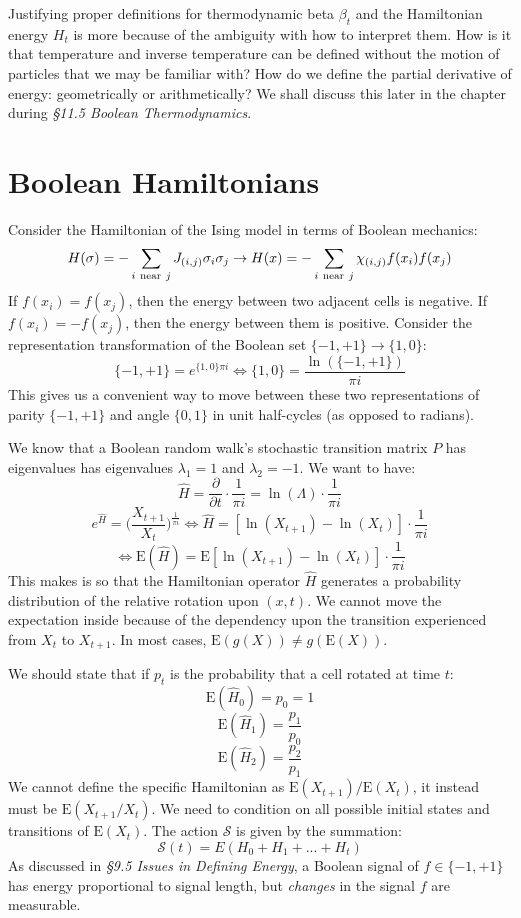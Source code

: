 \documentclass[10pt, a5paper, twoside, openright]{memoir}
\begin{document}
Justifying proper definitions for thermodynamic beta $\beta_t$ and the Hamiltonian energy $H_t$ is more because of the ambiguity with how to interpret them. How is it that temperature and inverse temperature can be defined without the motion of particles that we may be familiar with? How do we define the partial derivative of energy: geometrically or arithmetically? We shall discuss this later in the chapter during \textit{\S 11.5 Boolean Thermodynamics}.

\section{Boolean Hamiltonians}
Consider the Hamiltonian of the Ising model in terms of Boolean mechanics:
$$H(\sigma) = - \sum\limits_{i \ \textnormal{near} \ j} J_{(i, j)} \sigma_i \sigma_j \rightarrow H(x) = - \sum\limits_{i \ \textnormal{near} \ j} \chi_{(i, j)} f(x_i) f(x_j)$$
If $f(x_i) = f(x_j)$, then the energy between two adjacent cells is negative. If $f(x_i) = -f(x_j)$, then the energy between them is positive. Consider the representation transformation of the Boolean set $\{-1, +1\} \rightarrow \{1, 0\}$:
$$\{-1, +1\} = e^{\{1, 0\} \pi i} \iff \{1, 0\} = \frac{\ln(\{-1, +1\})}{\pi i}$$
This gives us a convenient way to move between these two representations of parity $\{-1, +1\}$ and angle $\{0, 1\}$ in unit half-cycles (as opposed to radians).

We know that a Boolean random walk's stochastic transition matrix $P$ has eigenvalues has eigenvalues $\lambda_1 = 1$ and $\lambda_2 = -1$. We want to have:
$$\hat H = \frac{\partial}{\partial t} \cdot \frac{1}{\pi i} = \ln(\Lambda) \cdot \frac{1}{\pi i}$$
$$e^{\hat H} = \bigg ( \frac{X_{t+1}}{X_{t}} \bigg ) ^{\frac{1}{\pi i }} \iff \hat H = [\ln(X_{t+1}) - \ln(X_{t})] \cdot \frac{1}{\pi i}$$
$$\iff \mathrm{E}(\hat H) = \mathrm{E}[\ln(X_{t+1}) - \ln(X_{t})] \cdot \frac{1}{\pi i}$$
This makes is so that the Hamiltonian operator $\hat H$ generates a probability distribution of the relative rotation upon $(x, t)$. We cannot move the expectation inside because of the dependency upon the transition experienced from $X_t$ to $X_{t+1}$. In most cases, $\mathrm{E}(g(X)) \neq g(\mathrm{E}(X))$.

We should state that if $p_t$ is the probability that a cell rotated at time $t$:
$$\mathrm{E}(\hat H_0) = p_0 = 1$$ 
$$\mathrm{E}(\hat H_1) = \frac{p_1}{p_0}$$
$$\mathrm{E}(\hat H_2) = \frac{p_2}{p_1}$$
We cannot define the specific Hamiltonian as $\mathrm{E}(X_{t+1}) / \mathrm{E}(X_t)$, it instead must be $\mathrm{E}(X_{t+1} / X_t)$. We need to condition on all possible initial states and transitions of $\mathrm{E}(X_t)$. The action $\mathcal S$ is given by the summation: 
$$\mathcal S(t) = E(H_0 + H_1 + ...+ H_t)$$
As discussed in \textit{\S 9.5 Issues in Defining Energy}, a Boolean signal of $f \in \{-1, +1\}$ has energy proportional to signal length, but \textit{changes} in the signal $f$ are measurable.
\end{document}
